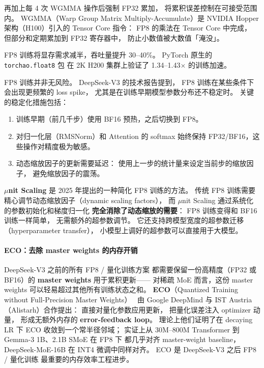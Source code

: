 再加上每 4 次 WGMMA 操作后强制 FP32 累加，
将累积误差控制在可接受范围内。
WGMMA（Warp Group Matrix Multiply-Accumulate）是
NVIDIA Hopper 架构（H100）引入的 Tensor Core 指令：
FP8 的乘法在 Tensor Core 中完成，
但部分和定期累加到 FP32 寄存器中，
防止小数值被大数值「淹没」。

FP8 训练将显存需求减半，吞吐量提升 30--40\%。
PyTorch 原生的 \texttt{torchao.float8} 包
在 2K H200 集群上验证了 1.34--1.43$\times$ 的训练加速。

\begin{warnbox}[FP8 训练的稳定性挑战]
FP8 训练并非无风险。
DeepSeek-V3 的技术报告提到，
FP8 训练在某些条件下会出现更频繁的 loss spike，
尤其是在训练早期模型参数分布还不稳定时。
关键的稳定化措施包括：
\begin{enumerate}[noitemsep]
  \item 训练早期（前几千步）使用 BF16 预热，之后切换到 FP8。
  \item 对归一化层（RMSNorm）和 Attention 的 softmax
        始终保持 FP32/BF16，这些操作对精度极为敏感。
  \item 动态缩放因子的更新需要延迟：
        使用上一步的统计量来设定当前步的缩放因子，
        避免缩放因子的震荡。
\end{enumerate}
\end{warnbox}

\textbf{$\mu$nit Scaling} 是 2025 年提出的一种简化 FP8 训练的方法。%
传统 FP8 训练需要精心调节动态缩放因子（dynamic scaling factors），
而 $\mu$nit Scaling 通过系统化的参数初始化和梯度归一化
\textbf{完全消除了动态缩放的需要}：
FP8 训练变得和 BF16 训练一样简单，
无需额外的超参数调节。
它还支持跨模型宽度的超参数迁移（hyperparameter transfer），
小模型上调好的超参数可以直接用于大模型。

\paragraph{ECO：去除 master weights 的内存开销}
DeepSeek-V3 之前的所有 FP8 / 量化训练方案
都需要保留一份高精度（FP32 或 BF16）的
\textbf{master weights} 用于累积更新——
对稀疏 MoE 而言，这份 master weights
可以轻易超过其他所有训练状态之和。
\textbf{ECO}（Quantized Training without Full-Precision
Master Weights）~\cite{eco2026}
由 Google DeepMind 与 IST Austria（Alistarh）合作提出：
直接对量化参数应用更新，
把量化误差注入 optimizer 动量，
形成无额外内存的\textbf{ error-feedback loop}。
理论上他们证明了在 decaying LR 下
ECO 收敛到一个常半径邻域；
实证上从 30M--800M Transformer
到 Gemma-3 1B、2.1B SMoE 在 FP8 下
都几乎对齐 master-weight baseline，
DeepSeek-MoE-16B 在 INT4 微调中同样对齐。
ECO 是 DeepSeek-V3 之后 FP8 / 量化训练
最重要的内存效率工程进步。

